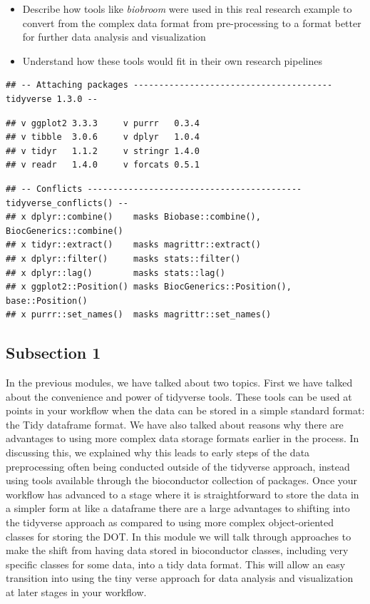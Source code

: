 \documentclass[]{tufte-book}
\providecommand{\tightlist}{%
  \setlength{\itemsep}{0pt}\setlength{\parskip}{0pt}}
\begin{document}
\begin{itemize}
\tightlist
\item
  Describe how tools like \textit{biobroom} were used in this real research
  example to convert from the complex data format from pre-processing to a format
  better for further data analysis and visualization
\item
  Understand how these tools would fit in their own research pipelines
\end{itemize}

\begin{verbatim}
## -- Attaching packages --------------------------------------- tidyverse 1.3.0 --
\end{verbatim}

\begin{verbatim}
## v ggplot2 3.3.3     v purrr   0.3.4
## v tibble  3.0.6     v dplyr   1.0.4
## v tidyr   1.1.2     v stringr 1.4.0
## v readr   1.4.0     v forcats 0.5.1
\end{verbatim}

\begin{verbatim}
## -- Conflicts ------------------------------------------ tidyverse_conflicts() --
## x dplyr::combine()    masks Biobase::combine(), BiocGenerics::combine()
## x tidyr::extract()    masks magrittr::extract()
## x dplyr::filter()     masks stats::filter()
## x dplyr::lag()        masks stats::lag()
## x ggplot2::Position() masks BiocGenerics::Position(), base::Position()
## x purrr::set_names()  masks magrittr::set_names()
\end{verbatim}

\hypertarget{subsection-1-8}{%
\subsection{Subsection 1}\label{subsection-1-8}}

In the previous modules, we have talked about two topics. First we have talked about the convenience and power of tidyverse tools. These tools can be used at points in your workflow when the data can be stored in a simple standard format: the Tidy dataframe format. We have also talked about reasons why there are advantages to using more complex data storage formats earlier in the process. In discussing this, we explained why this leads to early steps of the data preprocessing often being conducted outside of the tidyverse approach, instead using tools available through the bioconductor collection of packages. Once your workflow has advanced to a stage where it is straightforward to store the data in a simpler form at like a dataframe there are a large advantages to shifting into the tidyverse approach as compared to using more complex object-oriented classes for storing the DOT. In this module we will talk through approaches to make the shift from having data stored in bioconductor classes, including very specific classes for some data, into a tidy data format. This will allow an easy transition into using the tiny verse approach for data analysis and visualization at later stages in your workflow.
\end{document}
